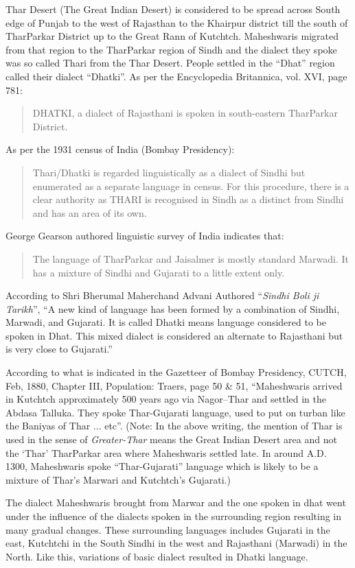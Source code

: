 Thar Desert (The Great Indian Desert) is considered to be spread across South
edge of Punjab to the west of Rajasthan to the Khairpur district till the south
of TharParkar District up to the Great Rann of Kutchtch. Maheshwaris migrated
from that region to the TharParkar region of Sindh and the dialect they spoke
was so called Thari from the Thar Desert. People settled in the ``Dhat'' region
called their dialect ``Dhatki''. As per the Encyclopedia Britannica, vol. XVI,
page 781:
\begin{quote}
 DHATKI, a dialect of Rajasthani is spoken in south-eastern TharParkar District.
\end{quote}
As per the 1931 census of India (Bombay Presidency):
\begin{quote}
Thari/Dhatki is regarded linguistically as a dialect of Sindhi but enumerated as
a separate language in census. For this procedure, there is a clear authority as
THARI is recognised in Sindh as a distinct from Sindhi and has an area of its
own.
\end{quote}
George Gearson authored linguistic survey of India indicates that:
\begin{quote}
The language of TharParkar and Jaisalmer is mostly standard Marwadi. It has a
mixture of Sindhi and Gujarati to a little extent only.
\end{quote}
According to Shri Bherumal Maherchand Advani Authored ``\textit{Sindhi Boli ji
Tarikh}'', ``A new kind of language has been formed by a combination of Sindhi,
Marwadi, and Gujarati. It is called Dhatki means language considered to be
spoken in Dhat. This mixed dialect is considered an alternate to Rajasthani but
is very close to Gujarati.''

According to what is indicated in the Gazetteer of Bombay Presidency, CUTCH,
Feb, 1880, Chapter III, Population: Traers, page 50 \& 51, ``Maheshwaris arrived
in Kutchtch approximately 500 years ago via Nagor--Thar and settled in the
Abdasa Talluka. They spoke Thar-Gujarati language, used to put on turban like
the Baniyas of Thar ... etc''. (Note: In the above writing, the mention of Thar
is used in the sense of \textit{Greater-Thar} means the Great Indian Desert area
and not the `Thar' TharParkar area where Maheshwaris settled late. In around
A.D. 1300, Maheshwaris spoke ``Thar-Gujarati'' language which is likely to be a
mixture of Thar's Marwari and Kutchtch's Gujarati.)

The dialect Maheshwaris brought from Marwar and the one spoken in dhat went
under the influence of the dialects spoken in the surrounding region resulting
in many gradual changes. These surrounding languages includes Gujarati in the
east, Kutchtchi in the South Sindhi in the west and Rajasthani (Marwadi) in the
North. Like this, variations of basic dialect resulted in Dhatki language.

